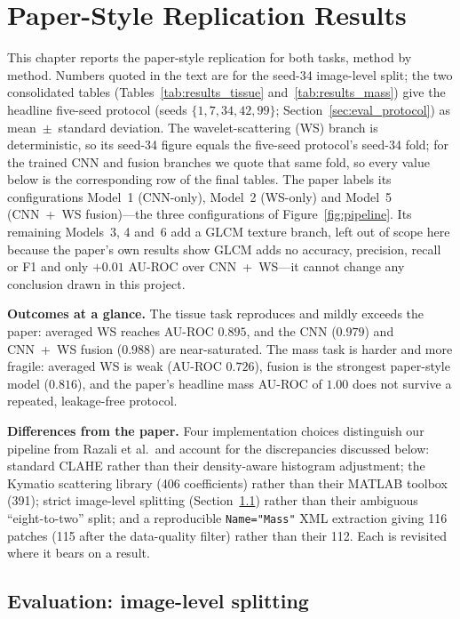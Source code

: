 
\chapter{Paper-Style Replication Results} \label{sec:results}

This chapter reports the paper-style replication for both tasks, method by method. Numbers quoted in the text are for the seed-34 image-level split; the two consolidated tables (Tables~\ref{tab:results_tissue} and~\ref{tab:results_mass}) give the headline five-seed protocol (seeds $\{1,7,34,42,99\}$; Section~\ref{sec:eval_protocol}) as mean~$\pm$~standard deviation. The wavelet-scattering (WS) branch is deterministic, so its seed-34 figure equals the five-seed protocol's seed-34 fold; for the trained CNN and fusion branches we quote that same fold, so every value below is the corresponding row of the final tables. The paper labels its configurations Model~1 (CNN-only), Model~2 (WS-only) and Model~5 (CNN~+~WS fusion)---the three configurations of Figure~\ref{fig:pipeline}. Its remaining Models~3, 4 and~6 add a GLCM texture branch, left out of scope here because the paper's own results show GLCM adds no accuracy, precision, recall or F1 and only $+0.01$ AU-ROC over CNN~+~WS---it cannot change any conclusion drawn in this project.

\textbf{Outcomes at a glance.} The tissue task reproduces and mildly exceeds the paper: averaged WS reaches AU-ROC $0.895$, and the CNN ($0.979$) and CNN~+~WS fusion ($0.988$) are near-saturated. The mass task is harder and more fragile: averaged WS is weak (AU-ROC $0.726$), fusion is the strongest paper-style model ($0.816$), and the paper's headline mass AU-ROC of $1.00$ does not survive a repeated, leakage-free protocol.

\textbf{Differences from the paper.} Four implementation choices distinguish our pipeline from Razali et al.\ and account for the discrepancies discussed below: standard CLAHE rather than their density-aware histogram adjustment; the Kymatio scattering library (406 coefficients) rather than their MATLAB toolbox (391); strict image-level splitting (Section~\ref{sec:stage3}) rather than their ambiguous ``eight-to-two'' split; and a reproducible \texttt{Name="Mass"} XML extraction giving 116 patches (115 after the data-quality filter) rather than their 112. Each is revisited where it bears on a result.

\section{Evaluation: image-level splitting} \label{sec:stage3}

